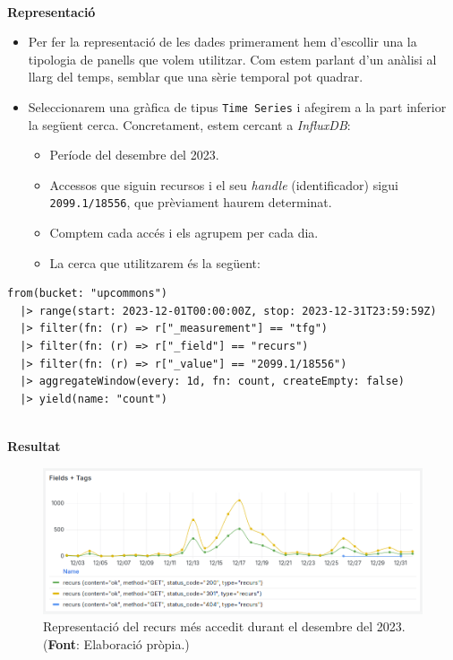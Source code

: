 \clearpage

\noindent \\
\textbf{Representació}

\begin{itemize}
    \item Per fer la representació de les dades primerament hem d'escollir una la tipologia de panells que volem utilitzar.
    Com estem parlant d'un anàlisi al llarg del temps, semblar que una sèrie temporal pot quadrar.

    \item Seleccionarem una gràfica de tipus \texttt{Time Series} i afegirem a la part inferior la següent cerca.
    Concretament, estem cercant a \textit{InfluxDB}:
    \begin{itemize}
        \item Període del desembre del 2023.
        \item Accessos que siguin recursos i el seu \textit{\gls{handle}} (identificador) sigui \texttt{2099.1/18556}, que prèviament haurem determinat.
        \item Comptem cada accés i els agrupem per cada dia.
        \item La cerca que utilitzarem és la següent:
    \end{itemize}
\end{itemize}

\noindent
\begin{verbatim}
from(bucket: "upcommons")
  |> range(start: 2023-12-01T00:00:00Z, stop: 2023-12-31T23:59:59Z)
  |> filter(fn: (r) => r["_measurement"] == "tfg")
  |> filter(fn: (r) => r["_field"] == "recurs")
  |> filter(fn: (r) => r["_value"] == "2099.1/18556")
  |> aggregateWindow(every: 1d, fn: count, createEmpty: false)
  |> yield(name: "count")
\end{verbatim}

\clearpage

\noindent \\
\textbf{Resultat}

\begin{figure}[htbp]
    \centerline{\includegraphics[width=\textwidth]{figures/most-accessed-resource}}
    \captionsetup{justification=centering}
    \caption[Representació del recurs més accedit durant el desembre del 2023.]{Representació del recurs més accedit durant el desembre del 2023. (\textbf{Font}: Elaboració pròpia.)}\label{fig:most-accessed-resource}
\end{figure}

